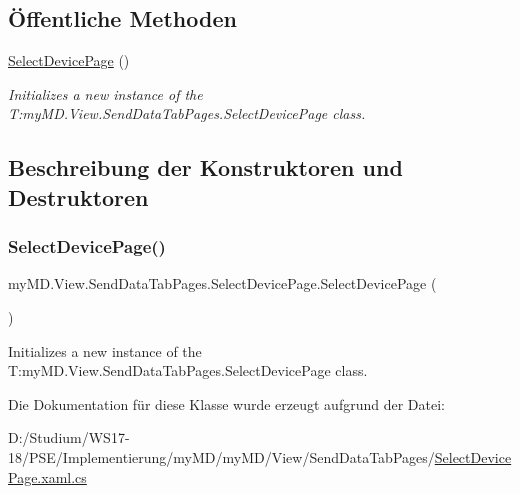 \subsection*{Öffentliche Methoden}
\begin{DoxyCompactItemize}
\item 
\mbox{\hyperlink{classmy_m_d_1_1_view_1_1_send_data_tab_pages_1_1_select_device_page_a64f3adab09e13f5a8739a275f64215f9}{Select\+Device\+Page}} ()
\begin{DoxyCompactList}\small\item\em Initializes a new instance of the T\+:my\+M\+D.\+View.\+Send\+Data\+Tab\+Pages.\+Select\+Device\+Page class. \end{DoxyCompactList}\end{DoxyCompactItemize}


\subsection{Beschreibung der Konstruktoren und Destruktoren}
\mbox{\label{classmy_m_d_1_1_view_1_1_send_data_tab_pages_1_1_select_device_page_a64f3adab09e13f5a8739a275f64215f9}} 
\subsubsection{\texorpdfstring{Select\+Device\+Page()}{SelectDevicePage()}}
{\footnotesize\ttfamily my\+M\+D.\+View.\+Send\+Data\+Tab\+Pages.\+Select\+Device\+Page.\+Select\+Device\+Page (\begin{DoxyParamCaption}{ }\end{DoxyParamCaption})}



Initializes a new instance of the T\+:my\+M\+D.\+View.\+Send\+Data\+Tab\+Pages.\+Select\+Device\+Page class. 



Die Dokumentation für diese Klasse wurde erzeugt aufgrund der Datei\+:\begin{DoxyCompactItemize}
\item 
D\+:/\+Studium/\+W\+S17-\/18/\+P\+S\+E/\+Implementierung/my\+M\+D/my\+M\+D/\+View/\+Send\+Data\+Tab\+Pages/\mbox{\hyperlink{_select_device_page_8xaml_8cs}{Select\+Device\+Page.\+xaml.\+cs}}\end{DoxyCompactItemize}
